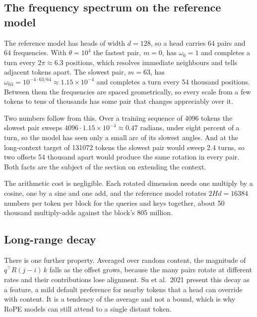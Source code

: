 \hypertarget{the-frequency-spectrum-on-the-reference-model}{%
\subsection{The frequency spectrum on the reference
model}\label{the-frequency-spectrum-on-the-reference-model}}

The reference model has heads of width \(d = 128\), so a head carries 64
pairs and 64 frequencies. With \(\theta = 10^4\) the fastest pair,
\(m = 0\), has \(\omega_0 = 1\) and completes a turn every
\(2\pi \approx 6.3\) positions, which resolves immediate neighbours and
tells adjacent tokens apart. The slowest pair, \(m = 63\), has
\(\omega_{63} = 10^{-4 \cdot 63/64} \approx 1.15 \times 10^{-4}\) and
completes a turn every 54 thousand positions. Between them the
frequencies are spaced geometrically, so every scale from a few tokens
to tens of thousands has some pair that changes appreciably over it.

Two numbers follow from this. Over a training sequence of 4096 tokens
the slowest pair sweeps \(4096 \cdot 1.15 \times 10^{-4} \approx 0.47\)
radians, under eight percent of a turn, so the model has seen only a
small arc of its slowest angles. And at the long-context target of
131072 tokens the slowest pair would sweep 2.4 turns, so two offsets 54
thousand apart would produce the same rotation in every pair. Both facts
are the subject of the section on extending the context.

The arithmetic cost is negligible. Each rotated dimension needs one
multiply by a cosine, one by a sine and one add, and the reference model
rotates \(2 H d = 16384\) numbers per token per block for the queries
and keys together, about 50 thousand multiply-adds against the block's
805 million.

\hypertarget{long-range-decay}{%
\subsection{Long-range decay}\label{long-range-decay}}

There is one further property. Averaged over random content, the
magnitude of \(q^{\top} R(j-i)\, k\) falls as the offset grows, because
the many pairs rotate at different rates and their contributions lose
alignment. Su et al.~2021 present this decay as a feature, a mild
default preference for nearby tokens that a head can override with
content. It is a tendency of the average and not a bound, which is why
RoPE models can still attend to a single distant token.

